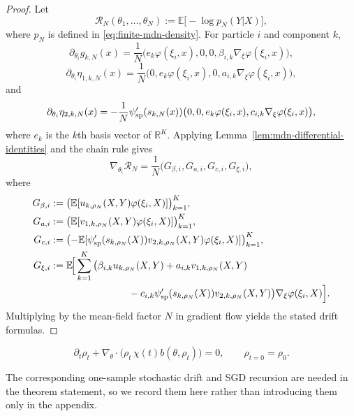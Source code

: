 \documentclass[11pt]{article}
\theoremstyle{definition}
\newcommand{\R}{\mathbb{R}}
\newcommand{\E}{\mathbb{E}}
\newcommand{\mc}[1]{\mathcal{#1}}
\begin{document}
\begin{proof}
Let
\[
  \mc{R}_N(\theta_1,\dots,\theta_N)
  :=
  \E\big[-\log p_N(Y|X)\big],
\]
where $p_N$ is defined in \eqref{eq:finite-mdn-density}. For particle $i$ and
component $k$,
\[
  \partial_{\theta_i} g_{k,N}(x)
  =
  \frac1N\bigl(e_k\varphi(\xi_i,x),0,0,\beta_{i,k}\nabla_\xi\varphi(\xi_i,x)\bigr),
\]
\[
  \partial_{\theta_i}\eta_{1,k,N}(x)
  =
  \frac1N\bigl(0,e_k\varphi(\xi_i,x),0,a_{i,k}\nabla_\xi\varphi(\xi_i,x)\bigr),
\]
and
\[
  \partial_{\theta_i}\eta_{2,k,N}(x)
  =
  -\frac1N\psi_{\rm sp}'(s_{k,N}(x))
  \bigl(0,0,e_k\varphi(\xi_i,x),c_{i,k}\nabla_\xi\varphi(\xi_i,x)\bigr),
\]
where $e_k$ is the $k$th basis vector of $\R^K$. Applying
Lemma~\ref{lem:mdn-differential-identities} and the chain rule gives
\[
  \nabla_{\theta_i}\mc{R}_N
  =
  \frac1N\bigl(G_{\beta,i},G_{a,i},G_{c,i},G_{\xi,i}\bigr),
\]
where
\begin{align*}
  G_{\beta,i}
  &:=
  \bigl(\E[u_{k,\rho_N}(X,Y)\varphi(\xi_i,X)]\bigr)_{k=1}^K,
  \\
  G_{a,i}
  &:=
  \bigl(\E[v_{1,k,\rho_N}(X,Y)\varphi(\xi_i,X)]\bigr)_{k=1}^K,
  \\
  G_{c,i}
  &:=
  \bigl(
    -\E[\psi_{\rm sp}'(s_{k,\rho_N}(X))v_{2,k,\rho_N}(X,Y)\varphi(\xi_i,X)]
  \bigr)_{k=1}^K,
  \\
  G_{\xi,i}
  &:=
  \E\!\Big[
    \sum_{k=1}^K
    \big(
      \beta_{i,k}u_{k,\rho_N}(X,Y)
      +a_{i,k}v_{1,k,\rho_N}(X,Y)
    \\
    &\hspace{8em}
      -c_{i,k}\psi_{\rm sp}'(s_{k,\rho_N}(X))v_{2,k,\rho_N}(X,Y)
    \big)\nabla_\xi\varphi(\xi_i,X)
  \Big].
\end{align*}
Multiplying by the mean-field factor $N$ in gradient flow yields the stated
drift formulas.
\end{proof}

\begin{equation}
  \partial_t \rho_t
  +
  \nabla_\theta\cdot\bigl(\rho_t\,\chi(t)b(\theta,\rho_t)\bigr)
  =
  0,
  \qquad
  \rho_{t=0}=\rho_0.
  \label{eq:mdn-sgd-pde}
\end{equation}

The corresponding one-sample stochastic drift and SGD recursion are needed in
the theorem statement, so we record them here rather than introducing them only
in the appendix.
\end{document}
